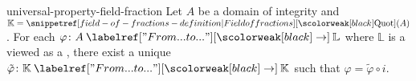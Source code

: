 \documentclass[preview]{standalone}
\begin{document}

\begin{snippetproposition}{universal-property-field-fraction}{}
    Let \(A\) be a domain of integrity and \(\mathbb{K} = \quotientfield(A)\).
    For each \injective \ringhomomorphism \(\varphi \colon A \fromto \mathbb{L}\)
    where \(\mathbb{L}\) is a \field viewed as a \ring,
    there exist a unique \ringhomomorphism \(\tilde{\varphi} \colon \mathbb{K} \fromto \mathbb{K}\)
    such that \(\varphi = \tilde{\varphi} \circ i\).
    \begin{center}
    \end{center}
\end{snippetproposition}
\end{document}
